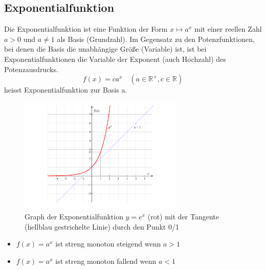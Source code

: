 \documentclass[a4paper]{article}
\begin{document}
\subsection{Exponentialfunktion}
Die Exponentialfunktion ist eine Funktion der Form $x \mapsto a^x$ mit einer reellen Zahl $a > 0$ und $a \neq 1$ als Basis (Grundzahl). Im Gegensatz zu den Potenzfunktionen, bei denen die Basis die unabhängige Größe (Variable) ist, ist bei Exponentialfunktionen die Variable der Exponent (auch Hochzahl) des Potenzausdrucks. 
\[f(x)=c a^x \quad (a \in \mathbb{R}^+,c \in \mathbb{R}) \] heisst Exponentialfunktion zur Basis a.
\begin{figure}[h!]
\centering
\includegraphics[width=0.7\textwidth]{images/exponentialfunktion}\caption{\label{fig:exponentialfunktion}{Graph der Exponentialfunktion $y=e^x$ (rot) mit der Tangente (hellblau gestrichelte Linie) durch den Punkt 0/1}}
\end{figure}
\begin{itemize}
\item $f(x)=a^x$ ist streng monoton steigend wenn $a>1$
\item $f(x)=a^x$ ist streng monoton fallend wenn $a<1$
\end{itemize}
\end{document}
